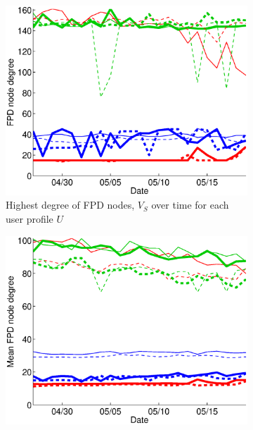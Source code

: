 \documentclass{sig-alternate}
\begin{document}
\begin{figure}

   \begin{subfigure}{.38\textwidth}
    \includegraphics[width=\textwidth]{figures/plots/first-mean-top1-entities.eps}
    \caption{Highest degree of FPD nodes, $V_S$ over time for each user profile $U$}
    \label{fig:first_mean_top1_with_entities}
  \end{subfigure}
  \begin{subfigure}{.38\textwidth}
    \includegraphics[width=\textwidth]{figures/plots/first-mean-top10-entities.eps}

\end{subfigure}
\end{figure}
\end{document}
